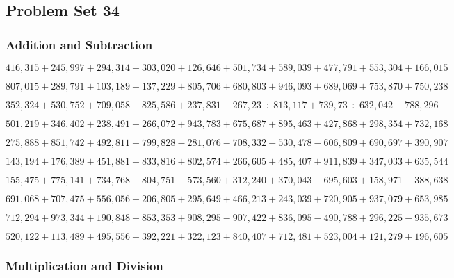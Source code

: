 \hypertarget{problem-set-34-5}{%
\subsection{Problem Set 34}\label{problem-set-34-5}}

\hypertarget{addition-and-subtraction-339}{%
\subsubsection{Addition and
Subtraction}\label{addition-and-subtraction-339}}

\(416,315+245,997+294,314+303,020+126,646+501,734+589,039+477,791+553,304+ 166,015\)

\(807,015+289,791+103,189+137,229+805,706+680,803+946,093+689,069+753,870+750,238\)

\(352,324+530,752+709,058+825,586+237,831-267,23÷813,117+739,73÷632,042-788,296\)

\(501,219+346,402+238,491+266,072+943,783+675,687+895,463+427,868+298,354+732,168\)

\(275,888+851,742+492,811+799,828-281,076-708,332-530,478-606,809+690,697+390,907\)

\(143,194+176,389+451,881+833,816+802,574+266,605+485,407+911,839+347,033+635,544\)

\(155,475+775,141+734,768-804,751-573,560+312,240+370,043-695,603+158,971-388,638\)

\(691,068+707,475+556,056+206,805+295,649+466,213+243,039+720,905+937,079+653,985\)

\(712,294+973,344+190,848-853,353+908,295-907,422+836,095-490,788+296,225-935,673\)

\(520,122+113,489+495,556+392,221+322,123+840,407+712,481+523,004+121,279+196,605\)

\hypertarget{multiplication-and-division-338}{%
\subsubsection{Multiplication and
Division}\label{multiplication-and-division-338}}

